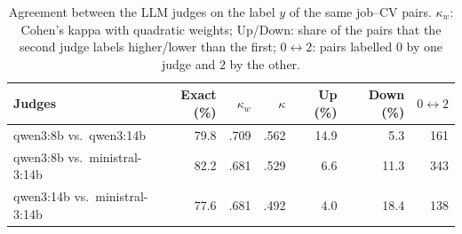 \begin{table}
\centering\scriptsize
\caption{Agreement between the LLM judges on the label $y$ of the same job--CV pairs. $\kappa_w$: Cohen's kappa with quadratic weights; Up/Down: share of the pairs that the second judge labels higher/lower than the first; $0 \leftrightarrow 2$: pairs labelled $0$ by one judge and $2$ by the other.}
\label{tab:judge-agreement}
\begin{tabular*}{\columnwidth}{@{\extracolsep{\fill}}lrrrrrr}
\toprule
Judges & Exact (\%) & $\kappa_w$ & $\kappa$ & Up (\%) & Down (\%) & $0 \leftrightarrow 2$ \\
\midrule
qwen3:8b vs.\ qwen3:14b & 79.8 & .709 & .562 & 14.9 & 5.3 & 161 \\
qwen3:8b vs.\ ministral-3:14b & 82.2 & .681 & .529 & 6.6 & 11.3 & 343 \\
qwen3:14b vs.\ ministral-3:14b & 77.6 & .681 & .492 & 4.0 & 18.4 & 138 \\
\bottomrule
\end{tabular*}
\end{table}
